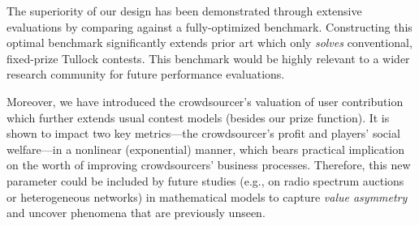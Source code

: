 \documentclass{sig-alternate-10pt}
\begin{document}
The superiority of our design has been demonstrated through extensive evaluations by comparing against a fully-optimized benchmark. Constructing this optimal benchmark significantly extends prior art which only {\em solves} conventional, fixed-prize Tullock contests. This benchmark would be highly relevant to a wider research community for future performance evaluations.

Moreover, we have introduced the crowdsourcer's valuation of user contribution which further extends usual contest models (besides our prize function). It is shown to impact two key metrics---the crowdsourcer's profit and players' social welfare---in a nonlinear (exponential) manner, which bears practical implication on the worth of improving crowdsourcers' business processes. Therefore, this new parameter could be included by future studies (e.g., on radio spectrum auctions or heterogeneous networks) in mathematical models to capture {\em value asymmetry}
and uncover phenomena that are previously unseen.





%

%
\end{document}

